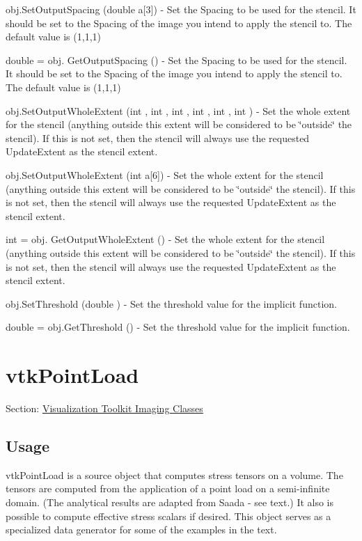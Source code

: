 \begin{DoxyItemize}
\item {\ttfamily obj.\-Set\-Output\-Spacing (double a\mbox{[}3\mbox{]})} -\/ Set the Spacing to be used for the stencil. It should be set to the Spacing of the image you intend to apply the stencil to. The default value is (1,1,1)  
\item {\ttfamily double = obj. Get\-Output\-Spacing ()} -\/ Set the Spacing to be used for the stencil. It should be set to the Spacing of the image you intend to apply the stencil to. The default value is (1,1,1)  
\item {\ttfamily obj.\-Set\-Output\-Whole\-Extent (int , int , int , int , int , int )} -\/ Set the whole extent for the stencil (anything outside this extent will be considered to be \char`\"{}outside\char`\"{} the stencil). If this is not set, then the stencil will always use the requested Update\-Extent as the stencil extent.  
\item {\ttfamily obj.\-Set\-Output\-Whole\-Extent (int a\mbox{[}6\mbox{]})} -\/ Set the whole extent for the stencil (anything outside this extent will be considered to be \char`\"{}outside\char`\"{} the stencil). If this is not set, then the stencil will always use the requested Update\-Extent as the stencil extent.  
\item {\ttfamily int = obj. Get\-Output\-Whole\-Extent ()} -\/ Set the whole extent for the stencil (anything outside this extent will be considered to be \char`\"{}outside\char`\"{} the stencil). If this is not set, then the stencil will always use the requested Update\-Extent as the stencil extent.  
\item {\ttfamily obj.\-Set\-Threshold (double )} -\/ Set the threshold value for the implicit function.  
\item {\ttfamily double = obj.\-Get\-Threshold ()} -\/ Set the threshold value for the implicit function.  
\end{DoxyItemize}\hypertarget{vtkimaging_vtkpointload}{}\section{vtk\-Point\-Load}\label{vtkimaging_vtkpointload}
Section\-: \hyperlink{sec_vtkimaging}{Visualization Toolkit Imaging Classes} \hypertarget{vtkwidgets_vtkxyplotwidget_Usage}{}\subsection{Usage}\label{vtkwidgets_vtkxyplotwidget_Usage}
vtk\-Point\-Load is a source object that computes stress tensors on a volume. The tensors are computed from the application of a point load on a semi-\/infinite domain. (The analytical results are adapted from Saada -\/ see text.) It also is possible to compute effective stress scalars if desired. This object serves as a specialized data generator for some of the examples in the text.

